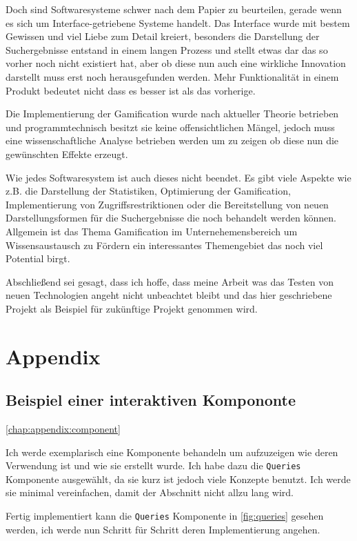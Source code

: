 \documentclass[12pt,twoside]{book}
\begin{document}
Doch sind Softwaresysteme schwer nach dem Papier zu beurteilen, gerade wenn es sich um Interface-getriebene Systeme handelt. Das Interface wurde mit bestem Gewissen und viel Liebe zum Detail kreiert, besonders die Darstellung der Suchergebnisse entstand in einem langen Prozess und stellt etwas dar das so vorher noch nicht existiert hat, aber ob diese nun auch eine wirkliche Innovation darstellt muss erst noch herausgefunden werden. Mehr Funktionalität in einem Produkt bedeutet nicht dass es besser ist als das vorherige.

Die Implementierung der Gamification wurde nach aktueller Theorie betrieben und programmtechnisch besitzt sie keine offensichtlichen Mängel, jedoch muss eine wissenschaftliche Analyse betrieben werden um zu zeigen ob diese nun die gewünschten Effekte erzeugt.

Wie jedes Softwaresystem ist auch dieses nicht beendet. Es gibt viele Aspekte wie z.B. die Darstellung der Statistiken, Optimierung der Gamification, Implementierung von Zugriffsrestriktionen oder  die Bereitstellung von neuen Darstellungsformen für die Suchergebnisse die noch behandelt werden können. Allgemein ist das Thema Gamification im Unternehemensbereich um Wissensaustausch zu Fördern ein interessantes Themengebiet das noch viel Potential birgt.

Abschließend sei gesagt, dass ich hoffe, dass meine Arbeit was das Testen von neuen Technologien angeht nicht unbeachtet bleibt und das hier geschriebene Projekt als Beispiel für zukünftige Projekt genommen wird.

\chapter{Appendix}

\section{Beispiel einer interaktiven Kompononte}\ref{chap:appendix:component}

Ich werde exemplarisch eine Komponente behandeln um aufzuzeigen wie deren Verwendung ist und wie sie erstellt wurde. Ich habe dazu die \texttt{Queries} Komponente ausgewählt, da sie kurz ist jedoch viele Konzepte benutzt. Ich werde sie minimal vereinfachen, damit der Abschnitt nicht allzu lang wird.

Fertig implementiert kann die \texttt{Queries} Komponente in \ref{fig:queries} gesehen werden, ich werde nun Schritt für Schritt deren Implementierung angehen.
\end{document}
